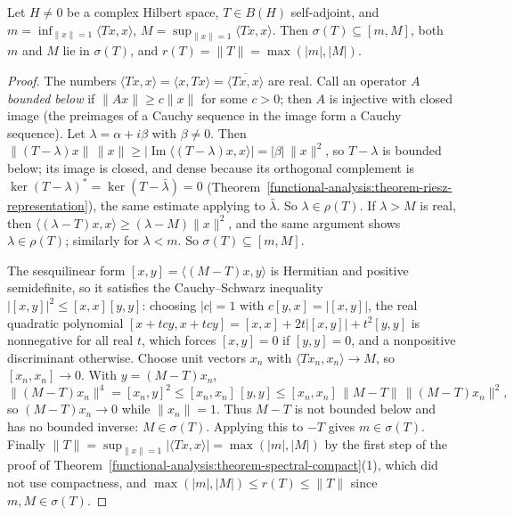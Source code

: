 \begin{proposition}\label{functional-analysis:proposition-spectrum-self-adjoint}
Let $H \neq 0$ be a complex Hilbert space, $T \in B(H)$ self-adjoint, and $m = \inf_{\|x\| = 1}\langle Tx, x \rangle$, $M = \sup_{\|x\| = 1}\langle Tx, x \rangle$. Then $\sigma(T) \subseteq [m, M]$, both $m$ and $M$
lie in $\sigma(T)$, and $r(T) = \|T\| = \max(|m|, |M|)$.
\end{proposition}

\begin{proof}
The numbers $\langle Tx, x \rangle = \langle x, Tx \rangle = \overline{\langle Tx, x \rangle}$ are real. Call an operator $A$ \emph{bounded below} if $\|Ax\| \geq c\|x\|$ for some $c > 0$; then $A$ is injective with closed image (the
preimages of a Cauchy sequence in the image form a Cauchy sequence). Let $\lambda = \alpha + i\beta$ with $\beta \neq 0$. Then
$\|(T - \lambda)x\|\,\|x\| \geq |\operatorname{Im}\langle (T - \lambda)x, x \rangle| = |\beta|\,\|x\|^2$, so $T - \lambda$ is bounded below; its image is closed, and dense because its orthogonal complement is
$\ker(T - \lambda)^* = \ker(T - \bar\lambda) = 0$ (Theorem~\ref{functional-analysis:theorem-riesz-representation}), the same estimate applying to $\bar\lambda$. So $\lambda \in \rho(T)$. If $\lambda > M$ is real, then
$\langle (\lambda - T)x, x \rangle \geq (\lambda - M)\|x\|^2$, and the same argument shows $\lambda \in \rho(T)$; similarly for $\lambda < m$. So $\sigma(T) \subseteq [m, M]$.

The sesquilinear form $[x, y] = \langle (M - T)x, y \rangle$ is Hermitian and positive semidefinite, so it satisfies the Cauchy--Schwarz inequality $|[x, y]|^2 \leq [x, x][y, y]$: choosing $|c| = 1$ with $c[y, x] = |[x, y]|$, the real quadratic polynomial
$[x + tcy, x + tcy] = [x, x] + 2t|[x, y]| + t^2[y, y]$ is nonnegative for all real $t$, which forces $[x, y] = 0$ if $[y, y] = 0$, and a nonpositive discriminant otherwise. Choose unit vectors $x_n$ with $\langle Tx_n, x_n \rangle \to M$, so $[x_n, x_n] \to 0$. With $y = (M - T)x_n$,
\[
\|(M - T)x_n\|^4 = [x_n, y]^2 \leq [x_n, x_n]\,[y, y] \leq [x_n, x_n]\,\|M - T\|\,\|(M - T)x_n\|^2,
\]
so $(M - T)x_n \to 0$ while $\|x_n\| = 1$. Thus $M - T$ is not bounded below and has no bounded inverse: $M \in \sigma(T)$. Applying this to $-T$ gives $m \in \sigma(T)$. Finally $\|T\| = \sup_{\|x\| = 1}|\langle Tx, x \rangle| = \max(|m|, |M|)$ by
the first step of the proof of Theorem~\ref{functional-analysis:theorem-spectral-compact}(1), which did not use compactness, and $\max(|m|, |M|) \leq r(T) \leq \|T\|$ since $m, M \in \sigma(T)$.
\end{proof}

